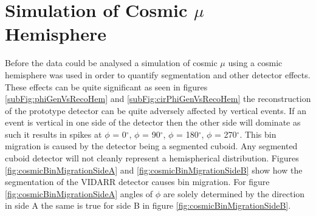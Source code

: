 \section{Simulation of Cosmic $\mu$ Hemisphere}\label{sec:SimulationOfCosmics}
Before the data could be analysed a simulation of cosmic $\mu$ using a cosmic hemisphere was used in order to quantify segmentation and other detector effects. These effects can be quite significant as seen in figures \ref{subFig:phiGenVsRecoHem} and \ref{subFig:cirPhiGenVsRecoHem} the reconstruction of the prototype detector can be quite adversely affected by vertical events. If an event is vertical in one side of the detector then the other side will dominate as such it results in spikes at $\phi$ = 0$^\circ$, $\phi$ = 90$^\circ$, $\phi$ = 180$^\circ$, $\phi$ = 270$^\circ$. This bin migration is caused by the detector being a segmented cuboid. Any segmented cuboid detector will not cleanly represent a hemispherical distribution. Figures \ref{fig:cosmicBinMigrationSideA} and \ref{fig:cosmicBinMigrationSideB} show how the segmentation of the VIDARR detector causes bin migration. For figure \ref{fig:cosmicBinMigrationSideA} angles of $\phi$ are solely determined by the direction in side A the same is true for side B in figure \ref{fig:cosmicBinMigrationSideB}. 


